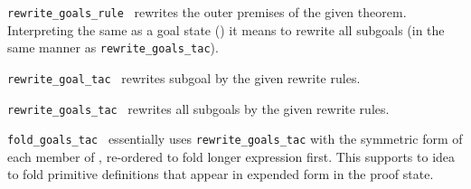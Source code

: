 \begin{isabellebody}
\begin{isamarkuptext}
\begin{description}
  \item \verb|rewrite_goals_rule|~ rewrites the
  outer premises of the given theorem.  Interpreting the same as a
  goal state () it means to rewrite all
  subgoals (in the same manner as \verb|rewrite_goals_tac|).

  \item \verb|rewrite_goal_tac|~ rewrites subgoal
   by the given rewrite rules.

  \item \verb|rewrite_goals_tac|~ rewrites all subgoals
  by the given rewrite rules.

  \item \verb|fold_goals_tac|~ essentially uses \verb|rewrite_goals_tac| with the symmetric form of each member of , re-ordered to fold longer expression first.  This supports
  to idea to fold primitive definitions that appear in expended form
  in the proof state.

  \end{description}%
\end{isamarkuptext}%
\isamarkuptrue%
%
\endisatagmlref
{\isafoldmlref}%
%
\isadelimmlref
%
\endisadelimmlref
%
\isadelimtheory
%
\endisadelimtheory
%
\isatagtheory
{}\isamarkupfalse%
%
\endisatagtheory
{\isafoldtheory}%
%
\isadelimtheory
%
\endisadelimtheory
\isanewline
\end{isabellebody}%
